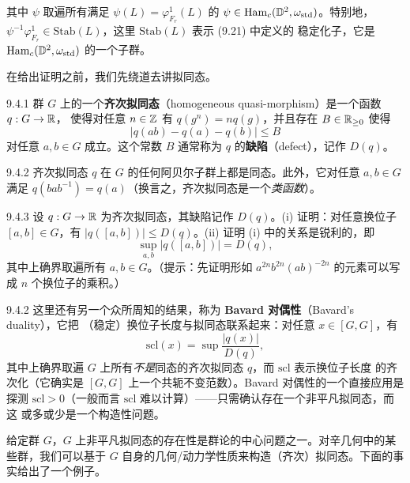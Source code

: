 其中 $\psi$ 取遍所有满足 $\psi(L)=\varphi_{F_r}^1(L)$ 的
$\psi\in\operatorname{Ham}_c(\mathbb{D}^2,\omega_{\mathrm{std}})$。特别地，
$\psi^{-1}\varphi_{F_r}^1\in\mathrm{Stab}(L)$，这里 $\mathrm{Stab}(L)$ 表示 (9.21) 中定义的
稳定化子，它是 $\operatorname{Ham}_c(\mathbb{D}^2,\omega_{\mathrm{std}})$ 的一个子群。

在给出证明之前，我们先绕道去讲拟同态。

\begin{wdefn}{9.4.1}
群 $G$ 上的一个\textbf{齐次拟同态}（homogeneous quasi-morphism）是一个函数 $q:G\to\mathbb{R}$，
使得对任意 $n\in\mathbb{Z}$ 有 $q(g^n)=nq(g)$，并且存在 $B\in\mathbb{R}_{\ge0}$ 使得
\[
  |q(ab)-q(a)-q(b)|\le B
\]
对任意 $a,b\in G$ 成立。这个常数 $B$ 通常称为 $q$ 的\textbf{缺陷}（defect），记作 $D(q)$。
\end{wdefn}

\begin{wexer}{9.4.2}
齐次拟同态 $q$ 在 $G$ 的任何阿贝尔子群上都是同态。此外，它对任意 $a,b\in G$ 满足
$q(bab^{-1})=q(a)$（换言之，齐次拟同态是一个\emph{类函数}）。
\end{wexer}

\begin{wexer}{9.4.3}
设 $q:G\to\mathbb{R}$ 为齐次拟同态，其缺陷记作 $D(q)$。(i) 证明：对任意换位子 $[a,b]\in G$，有
$|q([a,b])|\le D(q)$。(ii) 证明 (i) 中的关系是锐利的，即
\[
  \sup_{a,b}|q([a,b])|=D(q),
\]
其中上确界取遍所有 $a,b\in G$。（提示：先证明形如 $a^{2n}b^{2n}(ab)^{-2n}$ 的元素可以写成
$n$ 个换位子的乘积。）
\end{wexer}

\begin{wrem}{9.4.2}
这里还有另一个众所周知的结果，称为 \textbf{Bavard 对偶性}（Bavard's duality），它把
（稳定）换位子长度与拟同态联系起来：对任意 $x\in[G,G]$，有
\[
  \mathrm{scl}(x)=\sup\frac{|q(x)|}{D(q)},
\]
其中上确界取遍 $G$ 上所有\emph{不是}同态的齐次拟同态 $q$，而 $\mathrm{scl}$ 表示换位子长度
的齐次化（它确实是 $[G,G]$ 上一个共轭不变范数）。Bavard 对偶性的一个直接应用是探测
$\mathrm{scl}>0$（一般而言 $\mathrm{scl}$ 难以计算）——只需确认存在一个非平凡拟同态，而这
或多或少是一个构造性问题。
\end{wrem}

给定群 $G$，$G$ 上非平凡拟同态的存在性是群论的中心问题之一。对辛几何中的某些群，我们可以基于
$G$ 自身的几何/动力学性质来构造（齐次）拟同态。下面的事实给出了一个例子。

